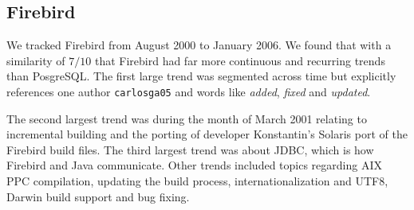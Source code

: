 \documentclass[times, 10pt,twocolumn]{article}
\begin{document}








\subsection{Firebird}


We tracked Firebird from August 2000 to January 2006. We found that with a
similarity of $7/10$ that Firebird had far more continuous and
recurring trends than PosgreSQL.  The first large trend was segmented
across time but explicitly references one author \texttt{carlosga05}
and words like \emph{added}, \emph{fixed} and \emph{updated}.

The second largest trend was during the month of March 2001 relating
to incremental building and the porting of developer Konstantin's
Solaris port of the Firebird build files. The third largest trend was
about JDBC, which is how Firebird and Java communicate.  Other trends
included topics regarding AIX PPC compilation, updating the build
process, internationalization and UTF8, Darwin build support and bug
fixing.
\end{document}
